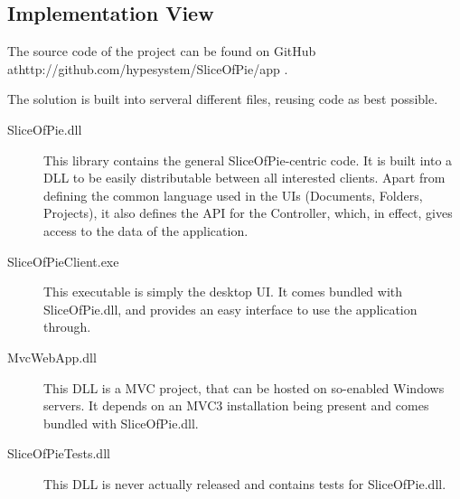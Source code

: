 \subsection{Implementation View}

The source code of the project can be found on GitHub at\newline http://github.com/hypesystem/SliceOfPie/app .

The solution is built into serveral different files, reusing code as best possible.

\begin{description}
    \item[SliceOfPie.dll] This library contains the general SliceOfPie-centric code. It is built into a
        DLL to be easily distributable between all interested clients. Apart from defining the common
        language used in the UIs (Documents, Folders, Projects), it also defines the API for the
        Controller, which, in effect, gives access to the data of the application.
    \item[SliceOfPieClient.exe] This executable is simply the desktop UI. It comes bundled with
        SliceOfPie.dll, and provides an easy interface to use the application through.
    \item[MvcWebApp.dll] This DLL is a MVC project, that can be hosted on so-enabled Windows servers.
        It depends on an MVC3 installation being present and comes bundled with SliceOfPie.dll.
    \item[SliceOfPieTests.dll] This DLL is never actually released and contains tests for SliceOfPie.dll.
\end{description}